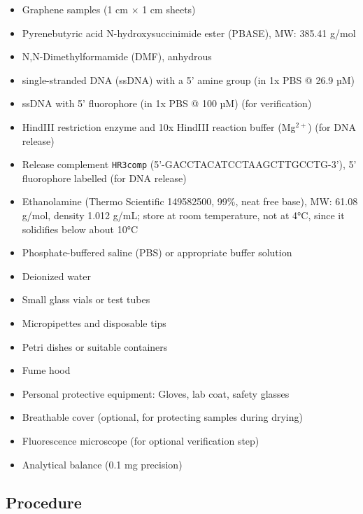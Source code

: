 \documentclass[11pt]{article}
\begin{document}
\begin{itemize}
    \item Graphene samples (1 cm $\times$ 1 cm sheets)
    \item Pyrenebutyric acid N-hydroxysuccinimide ester (PBASE), MW: 385.41 g/mol
    \item N,N-Dimethylformamide (DMF), anhydrous
    \item single-stranded DNA (ssDNA) with a 5' amine group (in 1x PBS @ 26.9 µM)
    \item ssDNA with 5' fluorophore (in 1x PBS @ 100 µM) (for verification)
    \item HindIII restriction enzyme and 10x HindIII reaction buffer (Mg$^{2+}$) (for DNA release)
    \item Release complement \texttt{HR3comp} (5'-GACCTACATCCTAAGCTTGCCTG-3'), 5' fluorophore labelled (for DNA release)
    \item Ethanolamine (Thermo Scientific 149582500, 99\%, neat free base), MW: 61.08 g/mol, density 1.012 g/mL; store at room temperature, not at 4°C, since it solidifies below about 10°C
    \item Phosphate-buffered saline (PBS) or appropriate buffer solution
    \item Deionized water
    \item Small glass vials or test tubes
    \item Micropipettes and disposable tips
    \item Petri dishes or suitable containers
    \item Fume hood
    \item Personal protective equipment: Gloves, lab coat, safety glasses
    \item Breathable cover (optional, for protecting samples during drying)
    \item Fluorescence microscope (for optional verification step)
    \item Analytical balance (0.1 mg precision)
\end{itemize}

\subsection*{Procedure}
\end{document}

